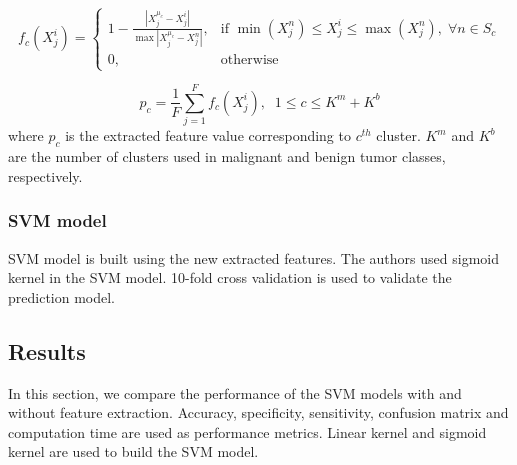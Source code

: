 \documentclass[twoside]{iitbreport}
\begin{document}
\begin{equation}
f_c(X^i_j) = \begin{cases}
    1 - \frac{|X_j^{\mu_c}-X_j^i|}{\max|X_j^{\mu_c}-X_j^n|},& \text{if } \min(X_j^n) \leq X_j^i \leq \max(X_j^n),\; \forall n \in S_c\\
    0,              & \text{otherwise}
\end{cases}
\end{equation}

\begin{equation}
p_c = \frac{1}{F} \sum_{j=1}^Ff_c(X_j^i),\;\; 1\leq c \leq K^m + K^b
\end{equation}
where $p_c$ is the extracted feature value corresponding to $c^{th}$ cluster. $K^m$ and $K^b$ are the number of clusters used in malignant and benign tumor classes, respectively.

\subsubsection{SVM model}
SVM model is built using the new extracted features. The authors used sigmoid kernel in the SVM model. 10-fold cross validation is used to validate the prediction model. 

\subsection{Results}
In this section, we compare the performance of the SVM models with and without feature extraction. Accuracy, specificity, sensitivity, confusion matrix and computation time are used as performance metrics. Linear kernel and sigmoid kernel are used to build the SVM model.    
\end{document}
